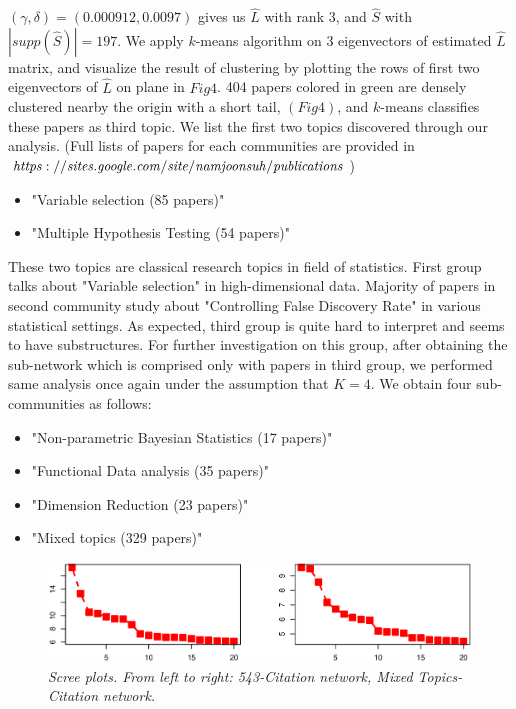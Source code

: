 \documentclass{article}
\begin{document}
\noindent $(\gamma,\delta) = (0.000912,0.0097)$ gives us $\hat{L}$ with rank 3, and $\hat{S}$ with $|supp(\hat{S})|=197$. We apply $k$-means algorithm on 3 eigenvectors of estimated $\hat{L}$ matrix, and visualize the result of clustering by plotting the rows of first two eigenvectors of $\hat{L}$ on plane in $Fig 4$. 404 papers colored in green are densely clustered nearby the origin with a short tail, $(Fig 4)$, and $k$-means classifies these papers as third topic. We list the first two topics discovered through our analysis. (Full lists of papers for each communities are provided in $\it https://sites.google.com/site/namjoonsuh/publications$)

\begin{itemize}
  \item "Variable selection (85 papers)" 
  \item "Multiple Hypothesis Testing (54 papers)"
\end{itemize}

\noindent These two topics are classical research topics in field of statistics. First group talks about "Variable selection" in high-dimensional data. Majority of papers in second community study about "Controlling False Discovery Rate" in various statistical settings. As expected, third group is quite hard to interpret and seems to have substructures. For further investigation on this group, after obtaining the sub-network which is comprised only with papers in third group, we performed same analysis once again under the assumption that $K=4$. We obtain four sub-communities as follows: 

\begin{itemize}
  \item "Non-parametric Bayesian Statistics (17 papers)"
  \item "Functional Data analysis (35 papers)"
  \item "Dimension Reduction (23 papers)"
  \item "Mixed topics (329 papers)"
\end{itemize}

\begin{figure}[b]
\includegraphics[width=1\textwidth]{Fig4.eps}
\caption{\it Scree plots. From left to right: 543-Citation network, Mixed Topics-Citation network.}
\label{fig:figure4}
\end{figure}
\end{document}
